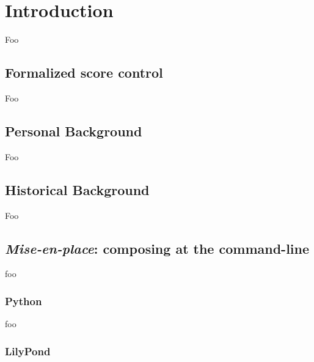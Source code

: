 \chapter{Introduction}

Foo

\section{Formalized score control}

Foo

\section{Personal Background}

Foo

\section{Historical Background}

Foo

\section{\emph{Mise-en-place}: composing at the command-line}

foo

\subsection{Python}

foo

\subsection{LilyPond}

